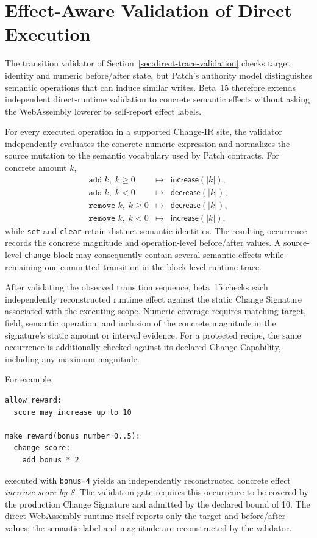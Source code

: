 \section{Effect-Aware Validation of Direct Execution}
\label{sec:direct-effect-validation}

The transition validator of Section~\ref{sec:direct-trace-validation} checks target identity and numeric before/after state, but Patch's authority model distinguishes semantic operations that can induce similar writes. Beta~15 therefore extends independent direct-runtime validation to concrete semantic effects without asking the WebAssembly lowerer to self-report effect labels.

For every executed operation in a supported Change-IR site, the validator independently evaluates the concrete numeric expression and normalizes the source mutation to the semantic vocabulary used by Patch contracts. For concrete amount $k$,
\[
\begin{array}{rcl}
\texttt{add}\; k,\;k\ge 0 &\mapsto& \mathsf{increase}(|k|),\\
\texttt{add}\; k,\;k<0 &\mapsto& \mathsf{decrease}(|k|),\\
\texttt{remove}\; k,\;k\ge 0 &\mapsto& \mathsf{decrease}(|k|),\\
\texttt{remove}\; k,\;k<0 &\mapsto& \mathsf{increase}(|k|),
\end{array}
\]
while \texttt{set} and \texttt{clear} retain distinct semantic identities. The resulting occurrence records the concrete magnitude and operation-level before/after values. A source-level \texttt{change} block may consequently contain several semantic effects while remaining one committed transition in the block-level runtime trace.

After validating the observed transition sequence, beta~15 checks each independently reconstructed runtime effect against the static Change Signature associated with the executing scope. Numeric coverage requires matching target, field, semantic operation, and inclusion of the concrete magnitude in the signature's static amount or interval evidence. For a protected recipe, the same occurrence is additionally checked against its declared Change Capability, including any maximum magnitude.

For example,
\begin{lstlisting}
allow reward:
  score may increase up to 10

make reward(bonus number 0..5):
  change score:
    add bonus * 2
\end{lstlisting}
executed with \texttt{bonus=4} yields an independently reconstructed concrete effect \emph{increase score by 8}. The validation gate requires this occurrence to be covered by the production Change Signature and admitted by the declared bound of 10. The direct WebAssembly runtime itself reports only the target and before/after values; the semantic label and magnitude are reconstructed by the validator.

